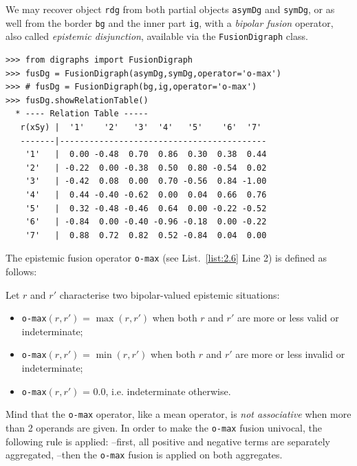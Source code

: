 We may recover object \texttt{rdg} from both partial objects \texttt{asymDg} and \texttt{symDg}, or as well from the border \texttt{bg} and the inner part \texttt{ig}, with a \emph{bipolar fusion} operator, also called \emph{epistemic disjunction}, available via the \texttt{FusionDigraph} class. 
\begin{lstlisting}[caption={Epistemic fusion of partial diagraphs},label=list:2.6]
>>> from digraphs import FusionDigraph
>>> fusDg = FusionDigraph(asymDg,symDg,operator='o-max')
>>> # fusDg = FusionDigraph(bg,ig,operator='o-max')
>>> fusDg.showRelationTable()
  * ---- Relation Table -----
   r(xSy) |  '1'    '2'   '3'  '4'   '5'    '6'  '7'	  
   -------|------------------------------------------
    '1'   |  0.00 -0.48  0.70  0.86  0.30  0.38  0.44	 
    '2'   | -0.22  0.00 -0.38  0.50  0.80 -0.54  0.02	 
    '3'   | -0.42  0.08  0.00  0.70 -0.56  0.84 -1.00	 
    '4'   |  0.44 -0.40 -0.62  0.00  0.04  0.66  0.76	 
    '5'   |  0.32 -0.48 -0.46  0.64  0.00 -0.22 -0.52	 
    '6'   | -0.84  0.00 -0.40 -0.96 -0.18  0.00 -0.22	 
    '7'   |  0.88  0.72  0.82  0.52 -0.84  0.04  0.00
\end{lstlisting}

The epistemic fusion operator \texttt{o-max} (see List.~\vref{list:2.6} Line 2) is defined as follows:
\begin{definition}\label{def:disjunctiveFusion}

\noindent Let $r$ and $r'$ characterise two bipolar-valued epistemic situations:
\begin{itemize}[leftmargin=0.5cm,rightmargin=0.5cm,nosep]
\item \texttt{o-max}$(r, r')$ = $\max(r, r' )$ when both $r$ and $r'$ are more or less valid or indeterminate;
\item \texttt{o-max}$(r, r')$ = $\min(r, r' )$ when both $r$ and $r'$ are more or less invalid or indeterminate;
\item \texttt{o-max}$(r, r')$ = $0.0$, i.e. indeterminate otherwise.
\end{itemize}
\end{definition}

Mind that the \texttt{o-max} operator, like a mean operator, is \emph{not associative} when more than 2 operands are given. In order to make the \texttt{o-max} fusion univocal, the following rule is applied: --first, all positive and negative terms are separately aggregated, --then the \texttt{o-max} fusion is applied on both aggregates.

